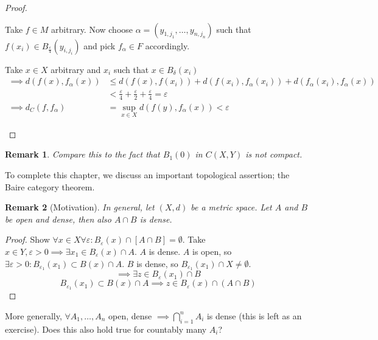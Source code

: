 \documentclass[a4paper]{article}
\numberwithin{lecref}{section}
\newtheorem*{Remark}{Remark}
\begin{document}
\begin{proof}
\begin{enumerate}
\begin{description}
					Take $f \in M$ arbitrary. Now choose $\alpha = (y_{1,j_1}, \dots, y_{n,j_n})$ such that $f(x_i) \in B_{\frac\varepsilon4}(y_{i,j_i})$ and pick $f_\alpha \in F$ accordingly.

					Take $x \in X$ arbitrary and $x_i$ such that $x \in B_\delta(x_i)$
					\begin{align*}
						\implies d(f(x), f_\alpha(x)) &\leq d(f(x), f(x_i)) + d(f(x_i), f_\alpha(x_i)) + d(f_\alpha(x_i), f_\alpha(x)) \\
							&< \frac\varepsilon4 + \frac\varepsilon2 + \frac\varepsilon4 = \varepsilon \\
						\implies d_C(f, f_\alpha) &= \sup_{x \in X} d(f(y), f_\alpha(x)) < \varepsilon
					\end{align*}
			\end{description}
	\end{enumerate}
\end{proof}

\begin{Remark}
	Compare this to the fact that $B_1(0)$ in $C(X, Y)$ is \emph{not} compact.
\end{Remark}

To complete this chapter, we discuss an important topological assertion; the Baire category theorem.

\begin{Remark}[Motivation]
	In general, let $(X, d)$ be a metric space. Let $A$ and $B$ be open and dense, then also $A \cap B$ is dense.
\end{Remark}

\begin{proof}
	Show $\forall x \in X \forall \varepsilon: B_\varepsilon(x) \cap [A \cap B] = \emptyset$.
	Take $x \in Y, \varepsilon > 0 \implies \exists x_1 \in B_{\varepsilon}(x) \cap A$. $A$ is dense.
	$A$ is open, so $\exists \varepsilon > 0: B_{\varepsilon_1}(x_1) \subset B(x) \cap A$.
	$B$ is dense, so $B_{\varepsilon_1}(x_1) \cap X \neq \emptyset$.
	\[ \implies \exists z \in B_{\varepsilon}(x_1) \cap B \]
	\[ B_{\varepsilon_1}(x_1) \subset B(x) \cap A \implies z \in B_\varepsilon(x) \cap (A \cap B) \]
\end{proof}

More generally, $\forall A_1, \dots, A_n$ open, dense $\implies \bigcap_{i=1}^n A_i$ is dense (this is left as an exercise).
Does this also hold true for countably many $A_i$?
\end{document}
